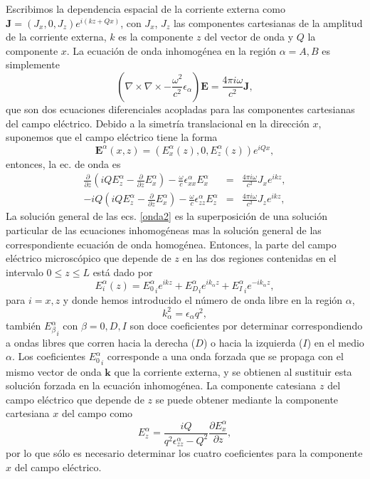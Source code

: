 \documentclass{iopart}
\begin{document}
Escribimos la dependencia espacial de la corriente externa como
$\mathbf J =(J_x, 0, J_z)e^{i(kz+Qx)}$, con $J_x$, $J_z$ las
componentes cartesianas de la amplitud de la corriente externa, $k$ es
la componente $z$ del vector de onda y $Q$ la componente $x$. La
ecuación de onda inhomogénea en la región $\alpha=A,B$ es simplemente
\begin{equation}
  \label{Eonda}
  \left(\nabla\times\nabla\times-\frac{\omega^2}{c^2}\epsilon_\alpha
  \right) \mathbf E = \frac{4 \pi i\omega}{c^2}\mathbf J,
\end{equation}
que son dos ecuaciones diferenciales acopladas para las componentes
cartesianas del campo eléctrico. Debido a la simetría translacional en
la dirección $x$, suponemos que el campo eléctrico tiene la forma
\begin{equation}
  \label{efield}
\mathbf E^{\alpha}(x,z) =( E_{x}^{\alpha}(z), 0, E_{z}^{\alpha}(z))e^{iQx},
\end{equation}
entonces, la ec. de onda es
\begin{eqnarray}  \label{onda2}
\frac{\partial}{\partial z}\left(i Q
E_{z}^{\alpha}-\frac{\partial}{\partial z} E_{x}^{\alpha}\right)
-\frac{\omega}{c}\epsilon_{xx}^{\alpha}E_{x}^{\alpha}&=& \frac{4 \pi
  i\omega}{c^2}J_xe^{ikz},\\-i Q\left(i Q E_{z}^{\alpha}-\frac{\partial}{\partial
  z} E_{x}^{\alpha}\right)
-\frac{\omega}{c}\epsilon_{zz}^{\alpha}E_{z}^{\alpha}&=& \frac{4 \pi
  i\omega}{c^2}J_ze^{ikz},
\end{eqnarray}
La solución general de las ecs. \ref{onda2} es la superposición de una
solución particular de las ecuaciones inhomogéneas mas la solución
general de las correspondiente ecuación de onda homogénea. Entonces,
la parte del campo eléctrico microscópico que depende de $z$ en las
dos regiones contenidas en el intervalo $0\le z\le L$ está dado por
\begin{equation}
\label{Emicro1d}
  E^{\alpha}_i(z) ={ E^{\alpha}_0}_{i}e^{ikz}+
  {E^{\alpha}_{D}}_{i}e^{ik_{\alpha}z}+  {E^{\alpha}_{I}}_{i}e^{-ik_{\alpha}z},
\end{equation}
para $i=x,z$ y donde hemos introducido el número de onda libre en la
región $\alpha$,
\begin{equation}
\label{kmicro1d}
  k_{\alpha}^2=\epsilon_{\alpha}q^2,
\end{equation}
también ${E^{\alpha}_{\beta}}_{i}$ con $\beta=0,D,I$ son doce
coeficientes por determinar correspondiendo a ondas libres que corren
hacia la derecha ($D$) o hacia la izquierda ($I$) en el medio
$\alpha$.  Los coeficientes ${E^{\alpha}_{0}}_{i}$ corresponde a una
onda forzada que se propaga con el mismo vector de onda $\mathbf k$
que la corriente externa, y se obtienen al sustituir esta solución
forzada en la ecuación inhomogénea. La componente catesiana $z$ del
campo eléctrico que depende de $z$ se puede obtener mediante la
componente cartesiana $x$ del campo como
\begin{equation}
\label{ez}
E^{\alpha}_{z}=\frac{iQ}{q^2\epsilon^{\alpha}_{zz}-Q^2}\frac{\partial
  E^{\alpha}_{x}} {\partial z},
\end{equation}
por lo que sólo es necesario determinar los cuatro coeficientes para
la componente $x$ del campo eléctrico.
\end{document}
